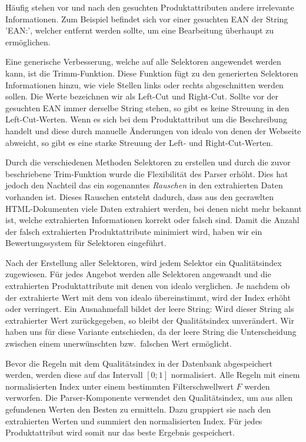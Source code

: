Häufig stehen vor und nach den gesuchten Produktattributen andere irrelevante Informationen.
Zum Beispiel befindet sich vor einer gesuchten EAN der String 'EAN:\textvisiblespace', welcher entfernt
werden sollte, um eine Bearbeitung überhaupt zu ermöglichen.

Eine generische Verbesserung, welche auf alle Selektoren angewendet werden kann, ist die Trimm-Funktion.
Diese Funktion fügt zu den generierten Selektoren Informationen hinzu, wie viele Stellen links oder rechts
abgeschnitten werden sollen.
Die Werte bezeichnen wir als Left-Cut und Right-Cut.
Sollte vor der gesuchten EAN immer derselbe String stehen, so gibt es keine Streuung in den Left-Cut-Werten.
Wenn es sich bei dem Produktattribut um die Beschreibung handelt und diese durch manuelle Änderungen von idealo von
denen der Webseite abweicht, so gibt es eine starke Streuung der Left- und Right-Cut-Werten.

Durch die verschiedenen Methoden Selektoren zu erstellen und durch die zuvor beschriebene Trim-Funktion wurde die
Flexibilität des Parser erhöht.
Dies hat jedoch den Nachteil das ein sogenanntes \textit{Rauschen} in den extrahierten Daten vorhanden ist.
Dieses Rauschen entsteht dadurch, dass aus den gecrawlten HTML-Dokumenten viele Daten extrahiert werden,
bei denen nicht mehr bekannt ist, welche extrahierten Informationen korrekt oder falsch sind.
Damit die Anzahl der falsch extrahierten Produktattribute minimiert wird, haben wir ein Bewertungssystem für
Selektoren eingeführt.

Nach der Erstellung aller Selektoren, wird jedem Selektor ein Qualitätsindex zugewiesen.
Für jedes Angebot werden alle Selektoren angewandt und die extrahierten Produktattribute mit denen von idealo
verglichen.
Je nachdem ob der extrahierte Wert mit dem von idealo übereinstimmt, wird der Index erhöht oder verringert.
Ein Ausnahmefall bildet der leere String: Wird dieser String als extrahierter Wert zurückgegeben, so bleibt der
Qualitätsindex unverändert.
Wir haben uns für diese Variante entschieden, da der leere String die Unterscheidung zwischen einem unerwünschten
bzw.\ falschen Wert ermöglicht.

Bevor die Regeln mit dem Qualitätsindex in der Datenbank abgespeichert werden, werden diese auf das Intervall $[0; 1]$
normalisiert.
Alle Regeln mit einem normalisierten Index unter einem bestimmten Filterschwellwert $F$ werden verworfen.
Die Parser-Komponente verwendet den Qualitätsindex, um aus allen gefundenen Werten den Besten zu ermitteln.
Dazu gruppiert sie nach den extrahierten Werten und summiert den normalisierten Index.
Für jedes Produktattribut wird somit nur das beste Ergebnis gespeichert.